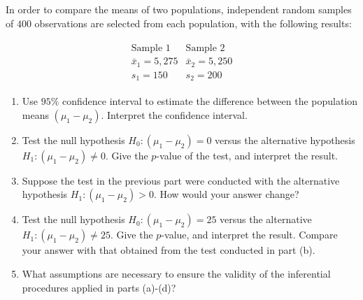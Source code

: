 
\begin{exercise}[Mechanics]

In order to compare the means of two populations, independent random samples of $400$ observations are selected from each population, with the following results:

\begin{align*}
    \begin{array}{ll}
        \text{Sample $1$}
        &
        \text{Sample $2$} \\
        \bar x_1 = 5,275
        &
        \bar x_2 = 5,250 \\
        s_1 = 150
        &
        s_2 = 200
    \end{array}
\end{align*}

\begin{enumerate}[label = (\alph*)]

    \item Use $95 \%$ confidence interval to estimate the difference between the population means $(\mu_1 - \mu_2)$.
    Interpret the confidence interval.

    \item Test the null hypothesis $H_0: (\mu_1 - \mu_2) = 0$ versus the alternative hypothesis $H_1: (\mu_1 - \mu_2) \neq 0$.
    Give the $p$-value of the test, and interpret the result.

    \item Suppose the test in the previous part were conducted with the alternative hypothesis $H_1: (\mu_1 - \mu_2) > 0$.
    How would your answer change?

    \item Test the null hypothesis $H_0: (\mu_1 - \mu_2) = 25$ versus the alternative $H_1: (\mu_1 - \mu_2) \neq 25$.
    Give the $p$-value, and interpret the result.
    Compare your answer with that obtained from the test conducted in part (b).

    \item What assumptions are necessary to ensure the validity of the inferential procedures applied in parts (a)-(d)?

\end{enumerate}

\end{exercise}


\begin{solution}

\phantom{}

\end{solution}

